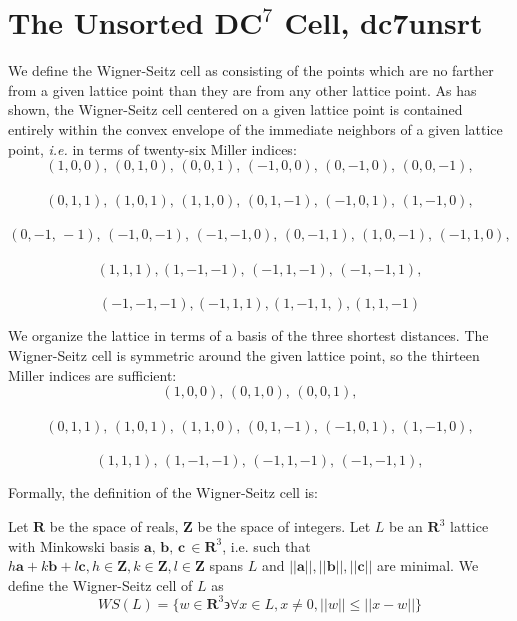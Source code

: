 \documentclass[preprint]{iucr}              %
\begin{document}
\section{The Unsorted $\mathbf{DC}^7$ Cell, dc7unsrt}

We define the Wigner-Seitz cell as consisting of the points which
are no farther from a given lattice point than they are from any
other lattice point.   As  has shown, the
Wigner-Seitz cell centered on a given lattice point is contained 
entirely within the convex envelope of the immediate 
neighbors of a given lattice point, {\it i.e.} in terms of twenty-six
Miller indices:
~~\\
\vspace{-5mm}
\[
(1,0,0),\,(0,1,0),\,(0,0,1),\,(-1,0,0),\,(0,-1,0),\,(0,0,-1),
\]
~~\\

\vspace{-30mm}
\[(0,1,1),\,(1,0,1),\,(1,1,0),\,(0,1,-1),\,(-1,0,1),\,(1,-1,0),
\]
~~\\

\vspace{-30mm}
\[
(0,-1,\,-1),\,(-1,0,-1),\,(-1,-1,0),\,(0,-1,1),\,(1,0,-1),\,(-1,1,0),
\]
~~\\

\vspace{-30mm}
\[
(1,1,1),(1,-1,-1),\,(-1,1,-1),\,(-1,-1,1),
\]
~~\\

\vspace{-30mm}
\[
(-1,-1,-1),(-1,1,1),(1,-1,1,),(1,1,-1)
\]

We organize the lattice in terms of a basis of the three shortest distances.
The Wigner-Seitz cell is symmetric around the given lattice point, so the thirteen Miller indices are sufficient:
~~\\

\vspace{-20mm}
\[
(1,0,0),\,(0,1,0),\,(0,0,1),
\]
~~\\

\vspace{-30mm}
\[
(0,1,1),\,(1,0,1),\,(1,1,0),\,(0,1,-1),\,(-1,0,1),\,(1,-1,0),
\]
~~\\

\vspace{-30mm}
\[
(1,1,1),\,(1,-1,-1),\,(-1,1,-1),\,(-1,-1,1),
\]

Formally, the definition of the Wigner-Seitz cell is:

Let $\mathbf{R}$ be the space of reals, $\mathbf{Z}$ be the
space of integers.  Let $L$ be an $\mathbf{R}^3$ lattice with Minkowski basis $\mathbf{a},\, \mathbf{b},\, \mathbf{c}\, \in \mathbf{R}^3$, i.e. such that $h\mathbf{a}+k\mathbf{b}+l\mathbf{c}, h \in \mathbf{Z}, k \in \mathbf{Z}, l \in \mathbf{Z}$ spans $L$ and $||\mathbf{a}||, ||\mathbf{b}||, ||\mathbf{c}||$ are minimal.  We define the Wigner-Seitz cell of $L$ as
\[
WS(L) = \{ w \in \mathbf{R}^3 \backepsilon \forall x \in L, x \neq 0, ||w|| \leq ||x-w|| \}
\] 
\end{document}
